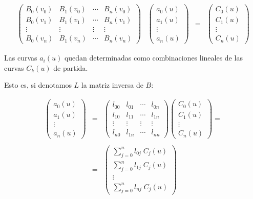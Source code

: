 \documentclass[twoside]{report}
\begin{document}
$$\begin{array}{cccc}
\left( \begin{array}{cccc} B_0(v_0)&B_1(v_0)& \cdots&
B_n(v_0)\\B_0(v_1)&B_1(v_1)& \cdots& B_n(v_1)\\ \vdots& \vdots &
\vdots & \vdots \\ B_0(v_n)&B_1(v_n)& \cdots & B_n(v_n)
\end{array} \right) & \left( \begin{array}{c} a_0(u)\\a_1(u) \\
\vdots \\ a_n(u)
\end{array} \right) & = & \left( \begin{array}{c} C_0(u) \\ C_1(u) \\
\vdots \\ C_n(u)
\end{array} \right)
\end{array}$$

Las curvas $a_i(u)$ quedan determinadas como combinaciones lineales de las curvas $C_k(u)$ de partida.

Esto es, si denotamos $L$ la matriz inversa de $B$:

\vspace{0.5cm}

$$\begin{array}{ccl}
\left(
\begin{array}{c} a_0(u)\\a_1(u) \\
\vdots \\ a_n(u)
\end{array}\right)&=&\left(
\begin{array}{cccc} l_{00}&l_{01}& \cdots&
l_{0n}\\l_{10}&l_{11}& \cdots& l_{1n}\\\vdots& \vdots&\vdots& \vdots\\
l_{n0}&l_{1n}& \cdots& l_{nn}
\end{array}\right) \left(
\begin{array}{c} C_0(u)\\C_1(u) \\
\vdots \\ C_n(u)
\end{array}\right)=\\ & & \\
&=&\left(
\begin{array}{c} \sum_{j=0}^n l_{0j} \;C_j(u)\\\sum_{j=0}^n l_{1j}\;C_j(u) \\
\vdots \\ \sum_{j=0}^n l_{nj}\; C_j(u)
\end{array}\right)
\end{array}$$
\end{document}
